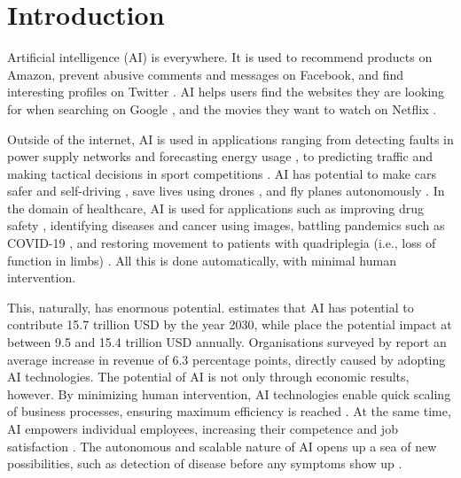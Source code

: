 \section{Introduction}
\label{sec:Introduction}
Artificial intelligence (AI) is everywhere. It is used to recommend products on Amazon, prevent abusive comments and messages on Facebook, and find interesting profiles on Twitter \parencite{Cooper_2022_intro}. AI helps users find the websites they are looking for when searching on Google \parencite{raghavan_2020_intro}, and the movies they want to watch on Netflix \parencite{netflix_intro}.

Outside of the internet, AI is used in applications ranging from detecting faults in power supply networks and forecasting energy usage \parencite{Quest_2022_intro}, to predicting traffic \parencite{Sarker_2021_intro} and making tactical decisions in sport competitions \parencite{Ding_2019_intro}. AI has potential to make cars safer \parencite{Myers_2022_intro} and self-driving \parencite{bmw_intro}, save lives using drones \parencite{drones_intro}, and fly planes autonomously \parencite{airbus_intro}. In the domain of healthcare, AI is used for applications such as improving drug safety \parencite{Basile_2019_intro}, identifying diseases \parencite{Kermany_2018_intro} and cancer \parencite{Hosny_2018_intro} using images, battling pandemics such as COVID-19 \parencite{Vaishya_2020_intro}, and restoring movement to patients with quadriplegia (i.e., loss of function in limbs) \parencite{Jiang_2017_intro}. All this is done automatically, with minimal human intervention.



This, naturally, has enormous potential. \textcite{pwc_value_intro} estimates that AI has potential to contribute 15.7 trillion USD by the year 2030, while \textcite{mckinsey_value_intro} place the potential impact at between 9.5 and 15.4 trillion USD annually. Organisations surveyed by \textcite{IBM_value_intro} report an average increase in revenue of 6.3 percentage points, directly caused by adopting AI technologies. The potential of AI is not only through economic results, however. By minimizing human intervention, AI technologies enable quick scaling of business processes, ensuring maximum efficiency is reached \parencite{Lardi_2021_intro}. At the same time, AI empowers individual employees, increasing their competence and job satisfaction \parencite{Ransbotham_2022_intro}. The autonomous and scalable nature of AI opens up a sea of new possibilities, such as detection of disease before any symptoms show up \parencite{Agrawal_2021_intro}.

